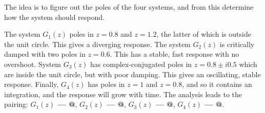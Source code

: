 \documentclass[letterpaper,12pt]{scrartcl}
\makeatletter
\newenvironment{exercise}[1][Problem]{\begin{trivlist} \item[\hskip
    \labelsep {\stepcounter{exerctr}\bfseries #1
      \arabic{exerctr}}]}{\end{trivlist}\vspace{10mm}}
\newcounter{exerctr}
\newcommand*{\rom}[1]{\expandafter\@slowromancap\romannumeral #1@}
\makeatother
\begin{document}
\begin{exercise}

The idea is to figure out the poles of the four systems, and from this determine how the system should respond.

The system $G_1(z)$ poles in $z=0.8$ and $z=1.2$, the latter of which is outside the unit circle. This gives a diverging response. The system $G_2(z)$ is critically damped with two poles in $z=0.6$. This has a stable, fast response with no overshoot. System $G_3(z)$ has complex-conjugated poles in $z = 0.8 \pm i0.5$ which are inside the unit circle, but with poor damping. This gives an oscillating, stable response. Finally, $G_4(z)$ has poles in $z=1$ and $z=0.8$, and so it contains an integration, and the response will grow with time. The analysis leads to the pairing: \textbf{$G_1(z)$ --- \rom{4}},  \textbf{$G_2(z)$ --- \rom{1}},  \textbf{$G_3(z)$ --- \rom{3}},  \textbf{$G_4(z)$ --- \rom{2}}. 
\end{exercise}
\end{document}
